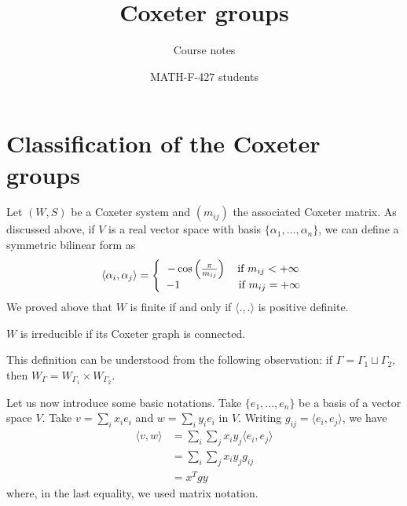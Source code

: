\documentclass[envcountsame,envcountchap]{svmono}
\begin{document}
\author{MATH-F-427 students}
\title{Coxeter groups}
\subtitle{Course notes}
\maketitle

\frontmatter%

\tableofcontents

\section{Classification of the Coxeter groups}

Let $(W,S)$ be a Coxeter system and $(m_{ij})$ the associated Coxeter matrix. As discussed above, if $V$ is a real vector space with basis $\{\alpha_1, \ldots , \alpha_n\}$, we can define a symmetric bilinear form as
\begin{equation}
\langle \alpha_i , \alpha_j \rangle = \left \{
\begin{array}{c @{} c}
    &- \cos \left(\frac{\pi}{m_{ij}} \right) \quad \text{if } m_{ij} < + \infty \\
    &-1 \quad ~~~~~~~~~~~~~\text{if } m_{ij} = + \infty \\
\end{array}
\right.
\end{equation} We proved above that $W$ is finite if and only if $\langle ., . \rangle$ is positive definite. 

\begin{definition}
$W$ is irreducible if its Coxeter graph is connected.
\end{definition}

This definition can be understood from the following observation: if $\Gamma = \Gamma_1 \sqcup \Gamma_2$, then $W_\Gamma = W_{\Gamma_1} \times W_{\Gamma_2}$. 

Let us now introduce some basic notations. Take $\{ e_1, \ldots, e_n \}$ be a basis of a vector space $V$. Take $v = \sum_i x_i e_i$ and $w =  \sum_i y_i e_i$ in $V$. Writing $g_{ij} = \langle e_i , e_j \rangle$, we have
\begin{equation}
\begin{split}
\langle v, w \rangle &= \sum_i \sum_j x_i y_j \langle e_i, e_j \rangle \\
&= \sum_i \sum_j x_i y_j g_{ij} \\
&= x^T g y 
\end{split}
\end{equation} where, in the last equality, we used matrix notation. 
\end{document}
